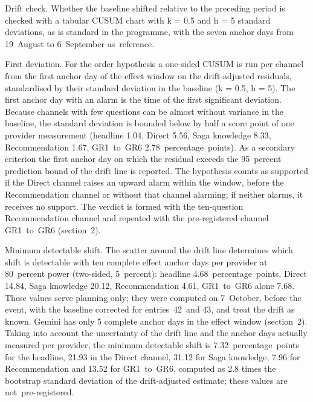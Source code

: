 \documentclass[11pt]{article}
\begin{document}
Drift check. Whether the baseline shifted relative to the preceding period is checked with a tabular CUSUM chart with k = 0.5 and h = 5 standard deviations, as is standard in the programme, with the seven anchor days from 19~August to 6~September as~\mbox{reference.}

First deviation. For the order hypothesis a one-sided CUSUM is run per channel from the first anchor day of the effect window on the drift-adjusted residuals, standardised by their standard deviation in the baseline (k = 0.5, h = 5). The first anchor day with an alarm is the time of the first significant deviation. Because channels with few questions can be almost without variance in the baseline, the standard deviation is bounded below by half a score point of one provider measurement (headline 1.04, Direct 5.56, Saga knowledge 8.33, Recommendation 1.67, GR1~to~GR6 2.78~percentage~points). As a secondary criterion the first anchor day on which the residual exceeds the 95~percent prediction bound of the drift line is reported. The hypothesis counts as supported if the Direct channel raises an upward alarm within the window, before the Recommendation channel or without that channel alarming; if neither alarms, it receives no support. The verdict is formed with the ten-question Recommendation channel and repeated with the pre-registered channel GR1~to~GR6 (section~2).

Minimum detectable shift. The scatter around the drift line determines which shift is detectable with ten complete effect anchor days per provider at 80~percent power (two-sided, 5~percent): headline 4.68~percentage~points, Direct 14.84, Saga knowledge 20.12, Recommendation 4.61, GR1~to~GR6 alone 7.68. These values serve planning only; they were computed on 7~October, before the event, with the baseline corrected for entries~42~and 43, and treat the drift as known. Gemini has only 5 complete anchor days in the effect window (section~2). Taking into account the uncertainty of the drift line and the anchor days actually measured per provider, the minimum detectable shift is 7.32~percentage~points for the headline, 21.93 in the Direct channel, 31.12 for Saga knowledge, 7.96 for Recommendation and 13.52 for GR1~to~GR6, computed as 2.8 times the bootstrap standard deviation of the drift-adjusted estimate; these values are not~\mbox{pre-registered.}
\end{document}
